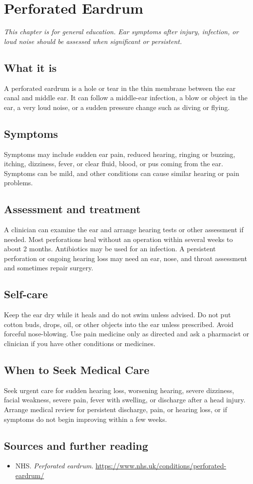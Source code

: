 \chapter{Perforated Eardrum}

\medskip
\noindent\textit{This chapter is for general education. Ear symptoms after injury, infection, or loud noise should be assessed when significant or persistent.}

\section*{What it is}
A perforated eardrum is a hole or tear in the thin membrane between the ear canal and middle ear. It can follow a middle-ear infection, a blow or object in the ear, a very loud noise, or a sudden pressure change such as diving or flying.

\section*{Symptoms}
Symptoms may include sudden ear pain, reduced hearing, ringing or buzzing, itching, dizziness, fever, or clear fluid, blood, or pus coming from the ear. Symptoms can be mild, and other conditions can cause similar hearing or pain problems.

\section*{Assessment and treatment}
A clinician can examine the ear and arrange hearing tests or other assessment if needed. Most perforations heal without an operation within several weeks to about 2 months. Antibiotics may be used for an infection. A persistent perforation or ongoing hearing loss may need an ear, nose, and throat assessment and sometimes repair surgery.

\section*{Self-care}
Keep the ear dry while it heals and do not swim unless advised. Do not put cotton buds, drops, oil, or other objects into the ear unless prescribed. Avoid forceful nose-blowing. Use pain medicine only as directed and ask a pharmacist or clinician if you have other conditions or medicines.

\section*{When to Seek Medical Care}
Seek urgent care for sudden hearing loss, worsening hearing, severe dizziness, facial weakness, severe pain, fever with swelling, or discharge after a head injury. Arrange medical review for persistent discharge, pain, or hearing loss, or if symptoms do not begin improving within a few weeks.

\section*{Sources and further reading}
\begin{itemize}
\item NHS. \textit{Perforated eardrum}. \url{https://www.nhs.uk/conditions/perforated-eardrum/}
\end{itemize}
